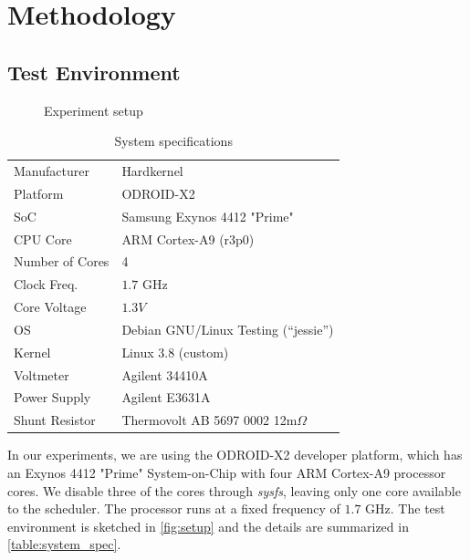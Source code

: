\section{Methodology}

\subsection{Test Environment}

\begin{figure}
    
    \caption{Experiment setup}
    \label{fig:setup}
\end{figure}

\begin{table}
    \centering
    \begin{tabular}{l|l}
        \hline
        \hline
        Manufacturer    & Hardkernel\\
        Platform        & ODROID-X2\\
        SoC             & Samsung Exynos 4412 "Prime"\\
        CPU Core        & ARM Cortex-A9 (r3p0)\\
        Number of Cores & 4\\
        Clock Freq.     & $1.7$ GHz\\
        Core Voltage    & $1.3V$\\
        OS              & Debian GNU/Linux Testing (``jessie'')\\
        Kernel          & Linux 3.8 (custom)\\
        \hline
        \hline
        Voltmeter       & Agilent 34410A\\
        Power Supply    & Agilent E3631A\\
        Shunt Resistor  & Thermovolt AB 5697 0002 12m$\Omega$\\
        \hline
        \hline
    \end{tabular}
    \caption{System specifications}
    \label{table:system_spec}
\end{table}

In our experiments, we are using the ODROID-X2 \cite{odroid-x2} developer
platform, which has an Exynos 4412 "Prime" System-on-Chip with four ARM
Cortex-A9 processor cores. We disable three of the cores through \emph{sysfs}, leaving only
one core available to the scheduler. The processor runs at a fixed frequency of
$1.7$ GHz. The test environment is sketched in \autoref{fig:setup} and the details are summarized in
\autoref{table:system_spec}.



